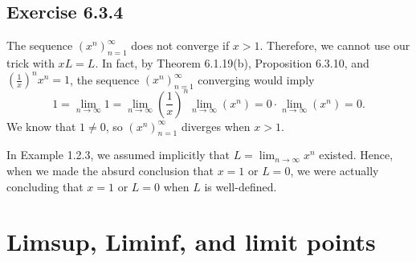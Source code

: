 \documentclass[12pt, oneside]{book}
\begin{document}
	\subsection*{Exercise 6.3.4}

	The sequence $(x^n)_{n = 1}^\infty$ does not converge if $x > 1$. Therefore, we cannot use our trick with $xL = L$. In fact, by Theorem 6.1.19(b), Proposition 6.3.10, and $(\frac{1}{x})^n x^n = 1$, the sequence $(x^n)_{n = 1}^\infty$ converging would imply
	\[1 = \lim_{n \to \infty} 1 = \lim_{n \to \infty} \left(\frac{1}{x} \right)^n \lim_{n \to \infty} (x^n) = 0 \cdot \lim_{n \to \infty} (x^n) = 0.\]
	We know that $1 \ne 0$, so $(x^n)_{n = 1}^\infty$ diverges when $x > 1$.

	In Example 1.2.3, we assumed implicitly that $L = \lim_{n \to \infty} x^n$ existed. Hence, when we made the absurd conclusion that $x = 1$ or $L = 0$, we were actually concluding that $x = 1$ or $L = 0$ when $L$ is well-defined.

	\section{Limsup, Liminf, and limit points}
\end{document}
